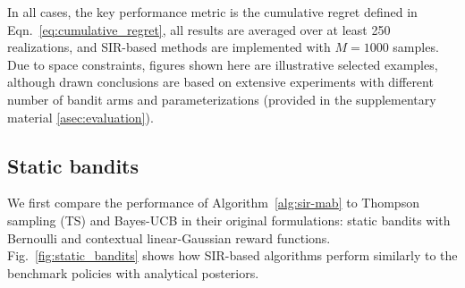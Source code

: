 \documentclass{article}
\def\addappendix{}
\begin{document}
In all cases, the key performance metric is the cumulative regret defined in Eqn.~\eqref{eq:cumulative_regret}, all results are averaged over at least 250 realizations, and SIR-based methods are implemented with $M=1000$ samples. Due to space constraints, figures shown here are illustrative selected examples, although drawn conclusions are based on extensive experiments with different number of bandit arms and parameterizations (provided in 
\ifx\addappendix\undefined the supplementary material \else \autoref{asec:evaluation}\fi).

\subsection{Static bandits}
\label{ssec:static_bandits}

We first compare the performance of Algorithm~\ref{alg:sir-mab} to Thompson sampling (TS) and Bayes-UCB in their original formulations: static bandits with Bernoulli and contextual linear-Gaussian reward functions. Fig.~\ref{fig:static_bandits} shows how SIR-based algorithms perform similarly to the benchmark policies with analytical posteriors.
\end{document}
